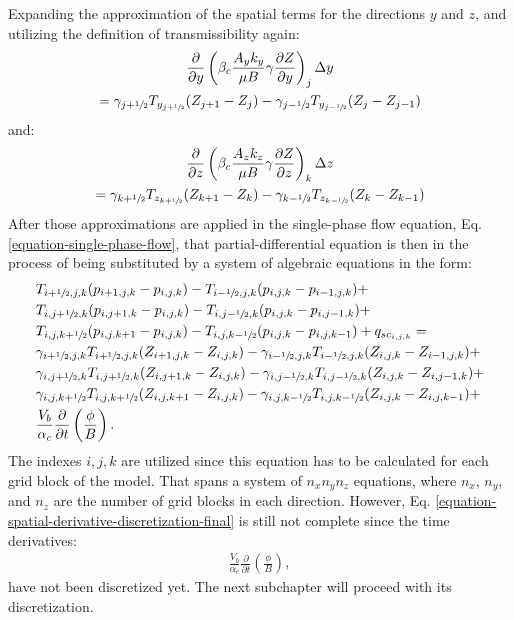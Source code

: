 %
Expanding the approximation of the spatial terms for the directions $y$ and $z$, and utilizing the definition of transmissibility again:
%
\begin{multline}
	\label{equation-spatial-derivative-discretization-transmissibility-y}
	\frac{\partial}{\partial y}\left( \beta_c \frac{A_y k_y}{\mu B}\gamma\frac{\partial Z}{\partial y}\right)_j \Delta y \\ =  \gamma_{j+\sfrac{1}{2}} T_{y_{j+\sfrac{1}{2}}} (Z_{j+1}-Z_j) - \gamma_{j-\sfrac{1}{2}} T_{y_{j-\sfrac{1}{2}}} (Z_j-Z_{j-1})
\end{multline}
%
and:
%
\begin{multline}
	\label{equation-spatial-derivative-discretization-transmissibility-z}
	\frac{\partial}{\partial z}\left( \beta_c \frac{A_z k_z}{\mu B}\gamma\frac{\partial Z}{\partial z}\right)_k \Delta z \\ =  \gamma_{k+\sfrac{1}{2}} T_{z_{k+\sfrac{1}{2}}} (Z_{k+1}-Z_k) - \gamma_{k-\sfrac{1}{2}} T_{z_{k-\sfrac{1}{2}}} (Z_k-Z_{k-1})
\end{multline}
%
After those approximations are applied in the single-phase flow equation, Eq. \ref{equation-single-phase-flow}, that partial-differential equation is then in the process of being substituted by a system of algebraic equations in the form:
%
\begin{align}\nonumber
	\label{equation-spatial-derivative-discretization-final}
	& T_{i+\sfrac{1}{2},j,k}(p_{i+1,j,k}-p_{i,j,k}) - T_{i-\sfrac{1}{2},j,k}(p_{i,j,k}-p_{i-1,j,k}) \nonumber +\\ &
	T_{i,j+\sfrac{1}{2},k}(p_{i,j+1,k}-p_{i,j,k}) - T_{i,j-\sfrac{1}{2},k}(p_{i,j,k}-p_{i,j-1,k}) \nonumber +\\ &
	T_{i,j,k+\sfrac{1}{2}}(p_{i,j,k+1}-p_{i,j,k}) - T_{i,j,k-\sfrac{1}{2}}(p_{i,j,k}-p_{i,j,k-1})
	 \nonumber +
	q_{sc_{i,j,k}} =\\ &
	\gamma_{i+\sfrac{1}{2},j,k} T_{i+\sfrac{1}{2},j,k}(Z_{i+1,j,k}-Z_{i,j,k}) - \gamma_{i-\sfrac{1}{2},j,k} T_{i-\sfrac{1}{2},j,k}(Z_{i,j,k}-Z_{i-1,j,k}) \nonumber +\\ &
	\gamma_{i,j+\sfrac{1}{2},k} T_{i,j+\sfrac{1}{2},k}(Z_{i,j+1,k}-Z_{i,j,k}) - \gamma_{i,j-\sfrac{1}{2},k} T_{i,j-\sfrac{1}{2},k}(Z_{i,j,k}-Z_{i,j-1,k}) \nonumber +\\ &
	\gamma_{i,j,k+\sfrac{1}{2}} T_{i,j,k+\sfrac{1}{2}}(Z_{i,j,k+1}-Z_{i,j,k}) - \gamma_{i,j,k-\sfrac{1}{2}} T_{i,j,k-\sfrac{1}{2}}(Z_{i,j,k}-Z_{i,j,k-1}) \nonumber +\\ &
	\frac {V_b}{\alpha_c}\frac{\partial}{\partial t}\left( \frac{\phi}{B}\right).
\end{align}	
%
The indexes $i,j,k$ are utilized since this equation has to be calculated for each grid block of the model.  That spans a system of $n_x n_y n_z$ equations, where $n_x$, $n_y$, and $n_z$ are the number of grid blocks in each direction.
%
However, Eq. \ref{equation-spatial-derivative-discretization-final} is still not complete since the time derivatives:
%
\begin{align}\nonumber
	\frac {V_b}{\alpha_c}\frac{\partial}{\partial t}\left( \frac{\phi}{B}\right),
\end{align}
%
have not been discretized yet. The next subchapter will proceed with its discretization.

